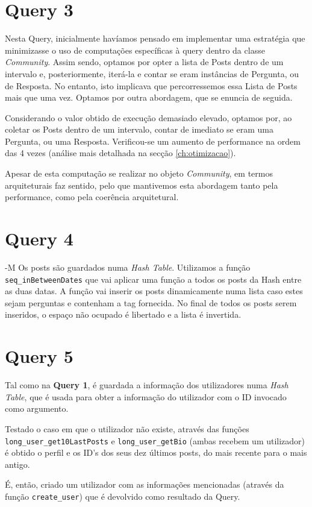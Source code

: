 \documentclass[a4paper]{report}
\begin{document}
	\section{Query 3}
		\tab Nesta Query, inicialmente havíamos pensado em implementar uma estratégia
		que minimizasse o uso de computações específicas à query dentro da classe \textit{Community}.
		Assim sendo, optamos por opter a lista de Posts dentro de um intervalo e, posteriormente,
		iterá-la e contar se eram instâncias de Pergunta, ou de Resposta. No entanto, isto implicava
		que percorressemos essa Lista de Posts mais que uma vez. Optamos por outra abordagem, que se enuncia de seguida.
		\par Considerando o valor obtido de execução demasiado elevado, optamos por, ao coletar os Posts dentro
		de um intervalo, contar de imediato se eram uma Pergunta, ou uma Resposta. Verificou-se um aumento
		de performance na ordem das 4 vezes (análise mais detalhada na secção \ref{ch:otimizacao}).
		\par Apesar de esta computação se realizar no objeto \textit{Community}, em termos arquiteturais faz sentido,
		pelo que mantivemos esta abordagem tanto pela performance, como pela coerência arquitetural.

	\section{Query 4} -M
	\tab Os posts são guardados numa \textit{Hash Table}. Utilizamos a função  \verb+seq_inBetweenDates+ que vai aplicar uma função a todos os posts da Hash entre as duas datas. A função vai inserir os posts dinamicamente numa lista caso estes sejam perguntas e contenham a tag fornecida. No final de todos os posts serem inseridos,  o espaço não ocupado é libertado e a lista é invertida.

	\section{Query 5}
	\tab Tal como na  \textbf{Query 1}, é guardada a informação dos utilizadores numa \textit{Hash Table}, que é usada para obter a informação do utilizador com o ID invocado como argumento. \par
	Testado o caso em que o utilizador não existe, através das funções\\ \verb+long_user_get10LastPosts+ e \verb+long_user_getBio+ (ambas recebem um utilizador) é obtido o perfil e os ID's dos seus dez últimos posts, do mais recente para o mais antigo.\par
	É, então, criado um utilizador com as informações mencionadas (através da função \verb+create_user+) que é devolvido como resultado da Query.
\end{document}

